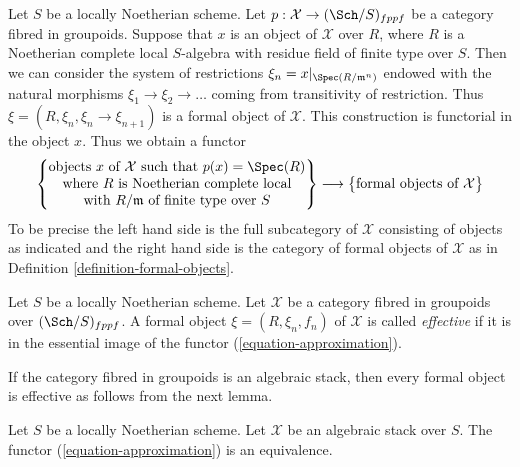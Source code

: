\noindent
Let $S$ be a locally Noetherian scheme. Let
$p : \mathcal{X} \to (\Sch/S)_{fppf}$ be a category fibred in groupoids.
Suppose that $x$ is an object of $\mathcal{X}$ over $R$, where $R$ is a
Noetherian complete local $S$-algebra with residue field of finite type
over $S$. Then we can consider the system of restrictions
$\xi_n = x|_{\Spec(R/\mathfrak m^n)}$ endowed with the natural morphisms
$\xi_1 \to \xi_2 \to \ldots$ coming from transitivity of restriction.
Thus $\xi = (R, \xi_n, \xi_n \to \xi_{n + 1})$ is a formal object of
$\mathcal{X}$. This construction is functorial in the object $x$.
Thus we obtain a functor
\begin{equation}
\label{equation-approximation}
\left\{
\begin{matrix}
\text{objects }x\text{ of }\mathcal{X} \text{ such that }p(x) = \Spec(R) \\
\text{where }R\text{ is Noetherian complete local}\\
\text{with }R/\mathfrak m\text{ of finite type over }S
\end{matrix}
\right\}
\longrightarrow
\left\{
\begin{matrix}
\text{formal objects of }\mathcal{X}
\end{matrix}
\right\}
\end{equation}
To be precise the left hand side is the full subcategory of $\mathcal{X}$
consisting of objects as indicated and the right hand side is the category
of formal objects of $\mathcal{X}$ as in
Definition \ref{definition-formal-objects}.

\begin{definition}
\label{definition-effective}
Let $S$ be a locally Noetherian scheme. Let $\mathcal{X}$ be a category
fibred in groupoids over $(\Sch/S)_{fppf}$. A formal object
$\xi = (R, \xi_n, f_n)$ of $\mathcal{X}$ is called {\it effective}
if it is in the essential image of the functor
(\ref{equation-approximation}).
\end{definition}

\noindent
If the category fibred in groupoids is an algebraic stack, then every
formal object is effective as follows from the next lemma.

\begin{lemma}
\label{lemma-effective}
Let $S$ be a locally Noetherian scheme. Let $\mathcal{X}$ be an algebraic
stack over $S$. The functor (\ref{equation-approximation}) is an equivalence.
\end{lemma}

